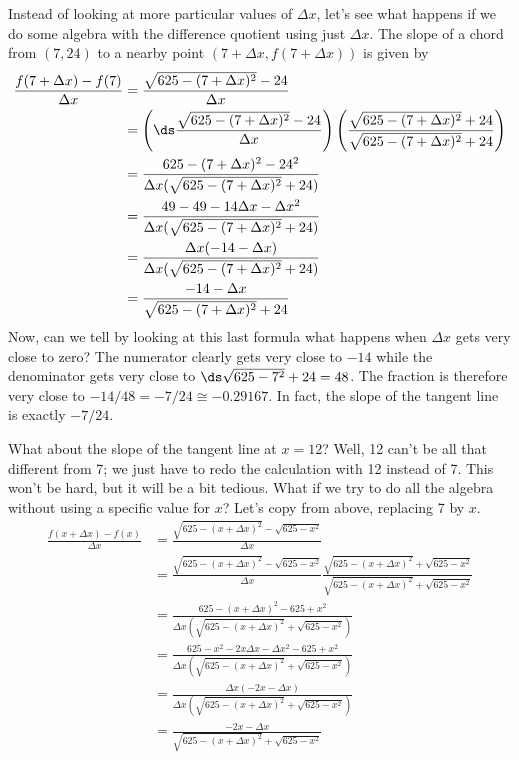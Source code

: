 Instead of looking at more particular values of $\Delta x$, let's see
what happens if we do some algebra with the difference quotient using
just $\Delta x$. The slope of a chord from $(7,24)$ to a nearby point
$\left(7+\Delta x,f(7+\Delta x)\right)$ is given by
\begin{align*}
\frac{f(7+\Delta x)-f(7)}{\Delta x}&=\frac{\sqrt{625-(7+\Delta x)^2} - 24}{\Delta x}\\
&= \left( \ds\frac{\sqrt{625-(7+\Delta x)^2} - 24}{\Delta x} \right) 
\left(\frac{\sqrt{625-(7+\Delta x)^2}+24}{\sqrt{625-(7+\Delta x)^2}+24} \right)\\
&=\frac{625-(7+\Delta x)^2-24^2}{\Delta x(\sqrt{625-(7+\Delta x)^2}+24)}\\
&=\frac{49-49-14\Delta x-\Delta x^2}{\Delta x(\sqrt{625-(7+\Delta x)^2}+24)}\\
&=\frac{\Delta x(-14-\Delta x)}{\Delta x(\sqrt{625-(7+\Delta x)^2}+24)}\\
&=\frac{-14-\Delta x}{\sqrt{625-(7+\Delta x)^2}+24}
\end{align*}
Now, can we tell by looking at this last formula what happens when
$\Delta x$ gets very close to zero? The numerator clearly gets very
close to $-14$ while the denominator gets very close to
$\ds \sqrt{625-7^2}+24=48$. The fraction is therefore very close to 
$-14/48 = -7/24 \cong -0.29167$. In fact, the slope of the tangent line is exactly $-7/24$.

What about the slope of the tangent line at $x=12$? Well, 12 can't be
all that different from 7; we just have to redo the calculation with
12 instead of 7. This won't be hard, but it will be a bit
tedious. What if we try to do all the algebra without using a specific
value for $x$? Let's copy from above, replacing 7 by  $x$.
\begin{align*}
\frac{f(x+\Delta x)-f(x)}{\Delta x}&=\frac{\sqrt{625-(x+\Delta x)^2} - \sqrt{625-x^2}}{\Delta x}\\
&=\frac{\sqrt{625-(x+\Delta x)^2} - \sqrt{625-x^2}}{\Delta x}
\frac{\sqrt{625-(x+\Delta x)^2}+\sqrt{625-x^2}}{\sqrt{625-(x+\Delta x)^2}+\sqrt{625-x^2}}\\
&=\frac{625-(x+\Delta x)^2-625+x^2}{\Delta x(\sqrt{625-(x+\Delta x)^2}+\sqrt{625-x^2})}\\
&=\frac{625-x^2-2x\Delta x-\Delta x^2-625+x^2}{\Delta x(\sqrt{625-(x+\Delta x)^2}+\sqrt{625-x^2})}\\
&=\frac{\Delta x(-2x-\Delta x)}{\Delta x(\sqrt{625-(x+\Delta x)^2}+\sqrt{625-x^2})}\\
&=\frac{-2x-\Delta x}{\sqrt{625-(x+\Delta x)^2}+\sqrt{625-x^2}}
\end{align*}


